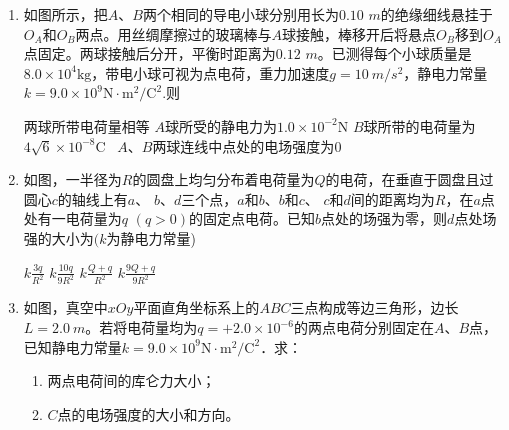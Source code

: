 \begin{enumerate}[leftmargin=0em]
\item
{}
如图所示，把$ A $、$ B $两个相同的导电小球分别用长为$ 0.10 $ $ m $的绝缘细线悬挂于$ O_A $和$ O_B $两点。用丝绸摩擦过的玻璃棒与$ A $球接触，棒移开后将悬点$ O_B $移到$ O_A $点固定。两球接触后分开，平衡时距离为$ 0.12 $ $ m $。已测得每个小球质量是$8.0 \times 10 ^ { 4 } \mathrm { kg }$，带电小球可视为点电荷，重力加速度$ g=10\ m/s^{2} $，静电力常量$k = 9.0 \times 10 ^ { 9 } \mathrm { N } \cdot \mathrm { m } ^ { 2 } / \mathrm { C } ^ { 2 }$.则  

\begin{minipage}[h!]{0.7\linewidth}
\vspace{0.3em}
\fourchoices
{两球所带电荷量相等}
{$ A $球所受的静电力为$1.0 \times 10 ^ { - 2 } \mathrm { N }$}
{$ B $球所带的电荷量为$4 \sqrt { 6 } \times 10 ^ { - 8 } \mathrm { C }$ }
{$ A $、$ B $两球连线中点处的电场强度为$ 0 $ }
\vspace{0.3em}
\end{minipage}
\hfill
\begin{minipage}[h!]{0.3\linewidth}
\flushright
\vspace{0.3em}

\vspace{0.3em}
\end{minipage}


\item
{}
如图，一半径为$ R $的圆盘上均匀分布着电荷量为$ Q $的电荷，在垂直于圆盘且过圆心$ c $的轴线上有$ a $、 $ b $、$ d $三个点，$ a $和$ b $、$ b $和$ c $、 $ c $和$ d $间的距离均为$ R $，在$ a $点处有一电荷量为$ q $ $ (q>0) $的固定点电荷。已知$ b $点处的场强为零，则$ d $点处场强的大小为$ (k $为静电力常量)  
\begin{figure}[h!]
\centering

\end{figure}
\fourchoices
{$k \frac { 3 q } { R ^ { 2 } }$}
{$k \frac { 10 q } { 9 R ^ { 2 } }$}
{$k \frac { Q + q } { R ^ { 2 } }$}
{$k \frac { 9 Q + q } { 9 R ^ { 2 } }$}


\item
{}
如图，真空中$ xOy $平面直角坐标系上的$ ABC $三点构成等边三角形，边长$ L=2 . 0 \ m $。若将电荷量均为$ q=+2 . 0 \times 10^{-6} $的两点电荷分别固定在$ A $、$ B $点，已知静电力常量$k = 9.0 \times 10 ^ { 9 } \mathrm { N } \cdot \mathrm { m } ^ { 2 } / \mathrm { C } ^ { 2 }$．求：
\begin{enumerate}
\renewcommand{\labelenumi}{\arabic{enumi}.}
\item
两点电荷间的库仑力大小；
\item 
$ C $点的电场强度的大小和方向。


\end{enumerate}
\end{enumerate}
